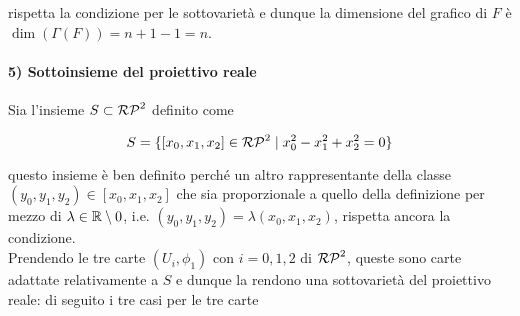 rispetta la condizione per le sottovarietà e dunque la dimensione del grafico di $ F $ è $ \dim(\Gamma(F)) = n+1-1 = n $.

\paragraph{5) Sottoinsieme del proiettivo reale}

Sia l'insieme $ S \subset \mathcal{RP}^{2} $ definito come

\begin{equation}
	S = \{ [x_{0},x_{1},x_{2}] \in \mathcal{RP}^{2} \mid x_{0}^{2} - x_{1}^{2} + x_{2}^{2} = 0 \}
\end{equation}

questo insieme è ben definito perché un altro rappresentante della classe $ (y_{0},y_{1},y_{2}) \in [x_{0},x_{1},x_{2}] $ che sia proporzionale a quello della definizione per mezzo di $ \lambda \in \mathbb{R} \setminus 0 $, i.e. $ (y_{0},y_{1},y_{2}) = \lambda (x_{0},x_{1},x_{2}) $, rispetta ancora la condizione.\\
Prendendo le tre carte $ (U_{i},\phi_{1}) $ con $ i=0,1,2 $ di $ \mathcal{RP}^{2} $, queste sono carte adattate relativamente a $ S $ e dunque la rendono una sottovarietà del proiettivo reale: di seguito i tre casi per le tre carte

